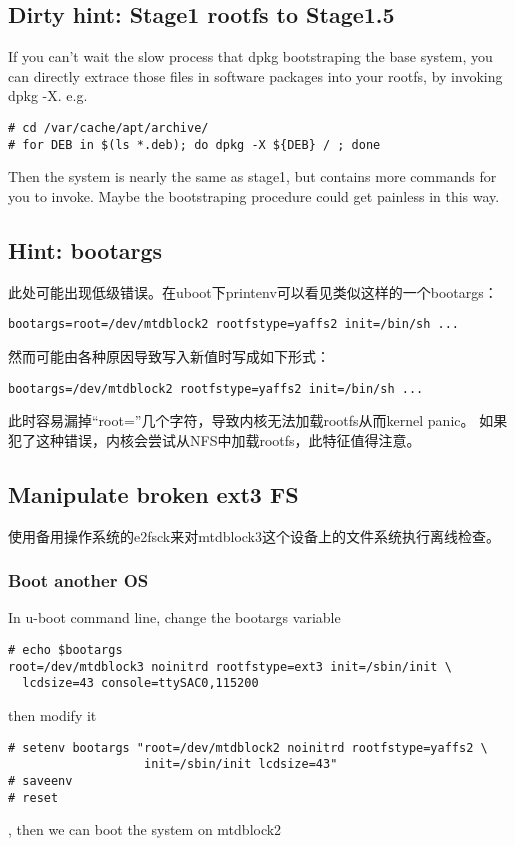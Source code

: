 \documentclass[11pt,a4paper]{article}
\begin{document}
\begin{CJK}{UTF8}{gbsn}
\subsection{Dirty hint: Stage1 rootfs to Stage1.5}
If you can't wait the slow process that dpkg bootstraping the base system,
   you can directly extrace those files in software packages into your rootfs,
   by invoking dpkg -X. \newline
e.g.
\begin{verbatim}
# cd /var/cache/apt/archive/
# for DEB in $(ls *.deb); do dpkg -X ${DEB} / ; done
\end{verbatim}
Then the system is nearly the same as stage1, but contains more
commands for you to invoke. Maybe the bootstraping procedure
could get painless in this way.

\subsection{Hint: bootargs}
此处可能出现低级错误。在uboot下printenv可以看见类似这样的一个bootargs：
\begin{verbatim}
bootargs=root=/dev/mtdblock2 rootfstype=yaffs2 init=/bin/sh ...
\end{verbatim}
然而可能由各种原因导致写入新值时写成如下形式：
\begin{verbatim}
bootargs=/dev/mtdblock2 rootfstype=yaffs2 init=/bin/sh ...
\end{verbatim}
此时容易漏掉“root=”几个字符，导致内核无法加载rootfs从而kernel panic。\newline
如果犯了这种错误，内核会尝试从NFS中加载rootfs，此特征值得注意。

\subsection{Manipulate broken ext3 FS}
使用备用操作系统的e2fsck来对mtdblock3这个设备上的文件系统执行离线检查。
\subsubsection{Boot another OS}
In u-boot command line, change the bootargs variable
\begin{verbatim}
# echo $bootargs
root=/dev/mtdblock3 noinitrd rootfstype=ext3 init=/sbin/init \
  lcdsize=43 console=ttySAC0,115200
\end{verbatim}
then modify it
\begin{verbatim}
# setenv bootargs "root=/dev/mtdblock2 noinitrd rootfstype=yaffs2 \
                   init=/sbin/init lcdsize=43"
# saveenv
# reset
\end{verbatim}
, then we can boot the system on mtdblock2

\end{CJK}
\end{document}
